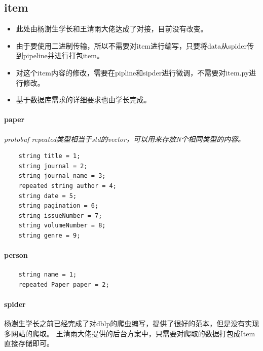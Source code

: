 \documentclass[UTF8]{ctexrep}
\begin{document}
\subsection{item}
\begin{itemize}
    

    \item 此处由杨澍生学长和王清雨大佬达成了对接，目前没有改变。

    \item 由于要使用二进制传输，所以不需要对item进行编写，只要将data从spider传到pipeline并进行打包item。
    
    \item 对这个item内容的修改，需要在pipline和sipder进行微调，不需要对item.py进行修改。
    
    \item 基于数据库需求的详细要求也由学长完成。
\end{itemize}

\paragraph{paper}
\textit{protobuf repeated类型相当于std的vector，可以用来存放N个相同类型的内容。}
\begin{verbatim}
    string title = 1;
    string journal = 2;
    string journal_name = 3;
    repeated string author = 4;
    string date = 5;
    string pagination = 6;
    string issueNumber = 7;
    string volumeNumber = 8;
    string genre = 9;
\end{verbatim}
\par

\paragraph{person}
\begin{verbatim}
    string name = 1;
    repeated Paper paper = 2;
\end{verbatim}
\par

\paragraph{spider}
杨澍生学长之前已经完成了对dblp的爬虫编写，提供了很好的范本，但是没有实现多网站的爬取。
王清雨大佬提供的后台方案中，只需要对爬取的数据打包成Item直接存储即可。
\par
\end{document}
